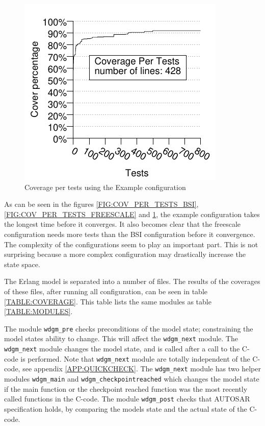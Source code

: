 \begin{figure}[!ht]
\begin{center}
\includegraphics{generated_pictures/coverage_per_tests_example.pdf}
\end{center}
\caption{Coverage per tests using the Example configuration}
\label{FIG:COV_PER_TESTS_EXAMPLE}
\end{figure}

As can be seen in the figures \ref{FIG:COV_PER_TESTS_BSI},
\ref{FIG:COV_PER_TESTS_FREESCALE} and \ref{FIG:COV_PER_TESTS_EXAMPLE},
the example configuration takes the longest time before it
converges. It also becomes clear that the freescale configuration
needs more tests than the BSI configuration before it convergence. The
complexity of the configurations seem to play an important
part. This is not surprising because a more complex configuration may
drastically increase the state space.

The Erlang model is separated into a number of files. The results of the
coverages of these files, after running all configuration, can be seen in table
\ref{TABLE:COVERAGE}. This table lists the same modules as table \ref{TABLE:MODULES}.

The module \lstinline!wdgm_pre!
checks preconditions of the model state; constraining the model states
ability to change. This will affect the \lstinline!wdgm_next!
module. The \lstinline!wdgm_next! module changes the model state, and
is called after a call to the C-code is performed. Note that
\lstinline!wdgm_next! module are totally independent of the C-code,
see appendix \ref{APP:QUICKCHECK}. The \lstinline!wdgm_next! module
has two helper modules \lstinline!wdgm_main! and
\lstinline!wdgm_checkpointreached! which changes the model state if
the main function or the checkpoint reached function was the most
recently called functions in the C-code. The module
\lstinline!wdgm_post! checks that AUTOSAR specification holds, by
comparing the models state and the actual state of the C-code.

